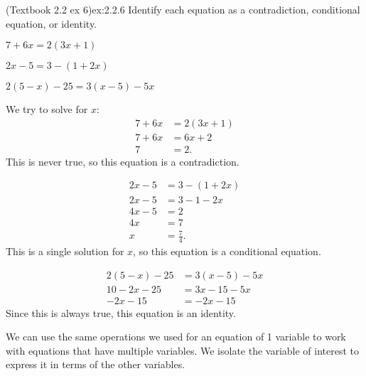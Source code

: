 \documentclass{article}
\begin{document}
\begin{example}{(Textbook 2.2 ex 6)}{ex:2.2.6}
    Identify each equation as a contradiction, conditional equation, or identity.
    \begin{problem}
        \item $7+6x=2(3x+1)$
        \item $2x-5=3-(1+2x)$
        \item $2(5-x)-25=3(x-5)-5x$
    \end{problem}
\end{example}
\begin{solution}
    \begin{problem}
        \item We try to solve for $x$:
        \begin{align*}
            7+6x&=2(3x+1)\\
            7+6x&=6x+2\\
            7&=2.
        \end{align*}
        This is never true, so this equation is a contradiction.
        \item \begin{align*}
            2x-5&=3-(1+2x)\\
            2x-5&=3-1-2x\\
            4x-5&=2\\
            4x&=7\\
            x&=\frac{7}{4}.
        \end{align*}
        This is a single solution for $x$, so this equation is a conditional equation.
        \item \begin{align*}
            2(5-x)-25&=3(x-5)-5x\\
            10-2x-25&=3x-15-5x\\
            -2x-15&=-2x-15
        \end{align*}
        Since this is always true, this equation is an identity.
    \end{problem}
\end{solution}

We can use the same operations we used for an equation of 1 variable to work with equations that have multiple variables. We isolate the variable of interest to express it in terms of the other variables.
\end{document}
